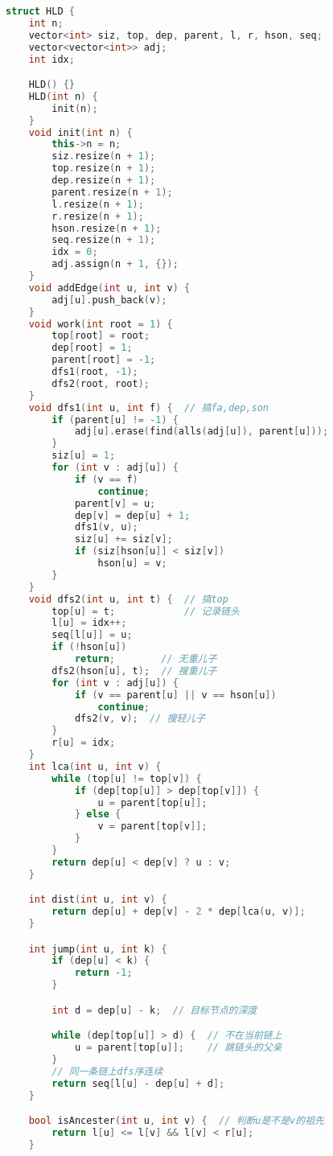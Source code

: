 \begin{lstlisting}[language=C++]
struct HLD {
    int n;
    vector<int> siz, top, dep, parent, l, r, hson, seq;
    vector<vector<int>> adj;
    int idx;

    HLD() {}
    HLD(int n) {
        init(n);
    }
    void init(int n) {
        this->n = n;
        siz.resize(n + 1);
        top.resize(n + 1);
        dep.resize(n + 1);
        parent.resize(n + 1);
        l.resize(n + 1);
        r.resize(n + 1);
        hson.resize(n + 1);
        seq.resize(n + 1);
        idx = 0;
        adj.assign(n + 1, {});
    }
    void addEdge(int u, int v) {
        adj[u].push_back(v);
    }
    void work(int root = 1) {
        top[root] = root;
        dep[root] = 1;
        parent[root] = -1;
        dfs1(root, -1);
        dfs2(root, root);
    }
    void dfs1(int u, int f) {  // 搞fa,dep,son
        if (parent[u] != -1) {
            adj[u].erase(find(alls(adj[u]), parent[u]));
        }
        siz[u] = 1;
        for (int v : adj[u]) {
            if (v == f)
                continue;
            parent[v] = u;
            dep[v] = dep[u] + 1;
            dfs1(v, u);
            siz[u] += siz[v];
            if (siz[hson[u]] < siz[v])
                hson[u] = v;
        }
    }
    void dfs2(int u, int t) {  // 搞top
        top[u] = t;            // 记录链头
        l[u] = idx++;
        seq[l[u]] = u;
        if (!hson[u])
            return;        // 无重儿子
        dfs2(hson[u], t);  // 搜重儿子
        for (int v : adj[u]) {
            if (v == parent[u] || v == hson[u])
                continue;
            dfs2(v, v);  // 搜轻儿子
        }
        r[u] = idx;
    }
    int lca(int u, int v) {
        while (top[u] != top[v]) {
            if (dep[top[u]] > dep[top[v]]) {
                u = parent[top[u]];
            } else {
                v = parent[top[v]];
            }
        }
        return dep[u] < dep[v] ? u : v;
    }

    int dist(int u, int v) {
        return dep[u] + dep[v] - 2 * dep[lca(u, v)];
    }

    int jump(int u, int k) {
        if (dep[u] < k) {
            return -1;
        }

        int d = dep[u] - k;  // 目标节点的深度

        while (dep[top[u]] > d) {  // 不在当前链上
            u = parent[top[u]];    // 跳链头的父亲
        }
        // 同一条链上dfs序连续
        return seq[l[u] - dep[u] + d];
    }

    bool isAncester(int u, int v) {  // 判断u是不是v的祖先
        return l[u] <= l[v] && l[v] < r[u];
    }


\end{lstlisting}
